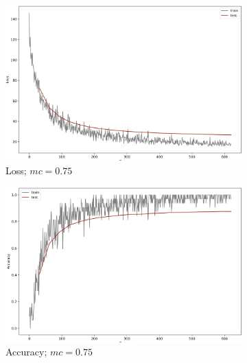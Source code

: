 \begin{figure}[]\ContinuedFloat
     \begin{subfigure}[b]{0.48\textwidth}
         \centering
         \includegraphics[width=\textwidth]{observational/img/bnn/mc/LC_mc0.75.png}
         \caption{Loss; $mc=0.75$}
     \end{subfigure}
     \hfill
     \begin{subfigure}[b]{0.48\textwidth}
         \centering
         \includegraphics[width=\textwidth]{observational/img/bnn/mc/AC_mc0.75.png}
         \caption{Accuracy; $mc=0.75$}
     \end{subfigure} 
     \par\bigskip
     \begin{subfigure}[b]{0.48\textwidth}
         \centering

\end{subfigure}
\end{figure}
